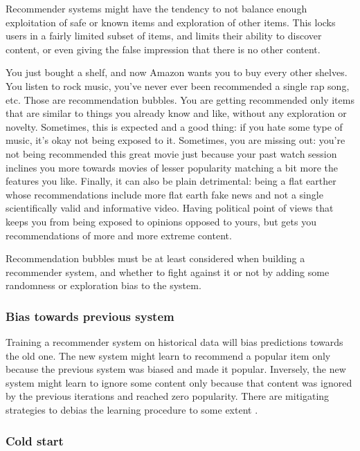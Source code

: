 Recommender systems might have the tendency to not balance enough exploitation of safe or known items and exploration of other items. This locks users in a fairly limited subset of items, and limits their ability to discover content, or even giving the false impression that there is no other content.

You just bought a shelf, and now Amazon wants you to buy every other shelves. You listen to rock music, you've never ever been recommended a single rap song, etc. Those are recommendation bubbles. You are getting recommended only items that are similar to things you already know and like, without any exploration or novelty. Sometimes, this is expected and a good thing: if you hate some type of music, it's okay not being exposed to it. Sometimes, you are missing out: you're not being recommended this great movie just because your past watch session inclines you more towards movies of lesser popularity matching a bit more the features you like. Finally, it can also be plain detrimental: being a flat earther whose recommendations include more flat earth fake news and not a single scientifically valid and informative video. Having political point of views that keeps you from being exposed to opinions opposed to yours, but gets you recommendations of more and more extreme content. \citep{filterbubble, filterbubblebook}

Recommendation bubbles must be at least considered when building a recommender system, and whether to fight against it or not by adding some randomness or exploration bias to the system.

\subsubsection{Bias towards previous system}

Training a recommender system on historical data will bias predictions towards the old one. The new system might learn to recommend a popular item only because the previous system was biased and made it popular. Inversely, the new system might learn to ignore some content only because that content was ignored by the previous iterations and reached zero popularity. There are mitigating strategies to debias the learning procedure to some extent \citep{youtuberec}.

\subsubsection{Cold start}

